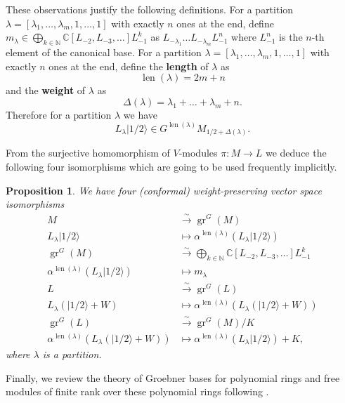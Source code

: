 \documentclass[12pt, a4paper]{article}
\newtheorem{proposition}{Proposition}
\DeclareMathOperator{\gr}{gr}
\DeclareMathOperator{\len}{len}
\newcommand{\vachalf}{|1/2\rangle}
\begin{document}
These observations justify the following definitions.
For a partition $\lambda = [\lambda_1, \dots, \lambda_m, 1, \dots, 1]$ with exactly $n$ ones at the end, define $m_\lambda \in \bigoplus_{k \in \mathbb{N}}\mathbb{C}[L_{-2}, L_{-3}, \dots]L_{-1}^k$ as $L_{-\lambda_1}\dots L_{-\lambda_m}L_{-1}^n$ where $L_{-1}^n$ is the $n$-th element of the canonical base.
For a partition $\lambda = [\lambda_1,\dots, \lambda_m, 1, \dots, 1]$ with exactly $n$ ones at the end, define the \textbf{length} of $\lambda$ as
\begin{equation*}
  \len(\lambda) = 2m + n
\end{equation*}
and the \textbf{weight} of $\lambda$ as
\begin{equation*}
  \Delta(\lambda) = \lambda_1 + \dots + \lambda_m + n.
\end{equation*}
Therefore for a partition $\lambda$ we have
\begin{equation*}
  L_{\lambda}\vachalf \in G^{\len(\lambda)}M_{1/2 + \Delta(\lambda)}.
\end{equation*}

From the surjective homomorphism of $V$-modules $\pi: M \to L$ we deduce the following four isomorphisms which are going to be used frequently implicitly.

\begin{proposition}
  \label{prp:6}
  We have four (conformal) weight-preserving vector space isomorphisms
  \begin{align*}
    M &\xrightarrow{\sim} \gr^G(M) \\
    L_\lambda\vachalf &\mapsto \alpha^{\len(\lambda)}(L_\lambda\vachalf) \\
    \gr^G(M) &\xrightarrow{\sim} \bigoplus_{k \in \mathbb{N}}\mathbb{C}[L_{-2}, L_{-3}, \dots]L_{-1}^k \\
    \alpha^{\len(\lambda)}(L_\lambda\vachalf) &\mapsto m_\lambda \\
    L &\xrightarrow{\sim} \gr^G(L) \\
    L_\lambda(\vachalf + W) &\mapsto \alpha^{\len(\lambda)}(L_\lambda(\vachalf + W)) \\
    \gr^G(L) &\xrightarrow{\sim} \gr^G(M)/K \\
    \alpha^{\len(\lambda)}(L_\lambda(\vachalf + W)) &\mapsto \alpha^{\len(\lambda)}(L_\lambda\vachalf) + K,
  \end{align*}
  where $\lambda$ is a partition.
\end{proposition}

Finally, we review the theory of Groebner bases for polynomial rings and free modules of finite rank over these polynomial rings following \cite{adams_introduction_1994}.
\end{document}
